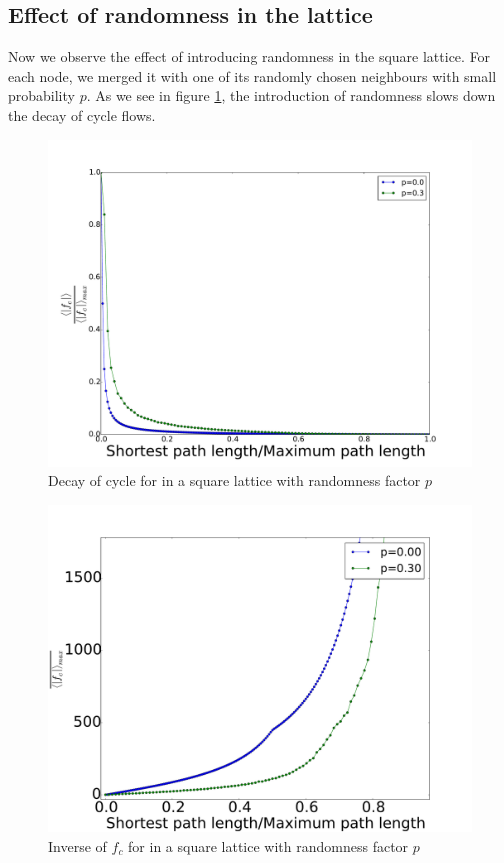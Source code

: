\documentclass[10pt,aps,pra,twocolumn,superscriptaddress]{revtex4-1}
\begin{document}
\subsection{Effect of randomness in the lattice}
Now we observe the effect of introducing randomness in the square lattice. For 
each node, we merged it with one of its randomly chosen neighbours with 
small probability $p$.  As we see in figure \ref{fig-decay-2p}, the 
introduction of randomness slows down the decay of cycle flows.   

\begin{figure}
    \includegraphics[width=.9\columnwidth]{pics/decay_2p}	
    \caption{Decay of cycle for in a square lattice with randomness factor $p$}
    \label{fig-decay-2p}
\end{figure}

\begin{figure}
    \includegraphics[width=.9\columnwidth]{pics/decay_2p_inv}	
    \caption{Inverse of $f_c$ for in a square lattice with randomness factor $p$}
    \label{fig-decay-2p-inv}
\end{figure}
\end{document}
